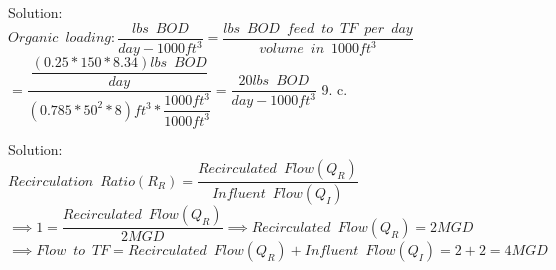Solution:\\
\vspace{0.5cm}
$Organic \enspace loading:\dfrac{lbs \enspace BOD}{day-1000ft^3}=\dfrac{lbs \enspace BOD \enspace feed \enspace to \enspace TF \enspace per \enspace day}{volume \enspace in \enspace 1000ft^3}$\\
\vspace{0.5cm}
$=\dfrac{\dfrac{(0.25*150*8.34)lbs \enspace BOD}{day}}{(0.785*50^2*8)ft^3*\dfrac{1000ft^3}{1000ft^3}}=\boxed{\dfrac{20 lbs \enspace BOD}{day-1000 ft^3}}$
\vspace{0.3cm}
9.	c.  

\vspace{0.3cm}

Solution:\\
\vspace{0.5cm}
$Recirculation \enspace Ratio (R_R)=\dfrac{Recirculated \enspace Flow (Q_R)}{Influent  \enspace  Flow (Q_I)}$\\
\vspace{0.5cm}
$ \implies 1=\dfrac{Recirculated \enspace Flow (Q_R)}{2MGD} \implies Recirculated \enspace Flow (Q_R)=2MGD$\\
$\implies Flow \enspace to \enspace TF= Recirculated \enspace Flow (Q_R)+Influent  \enspace  Flow (Q_I)=2+2=\boxed{4MGD}$